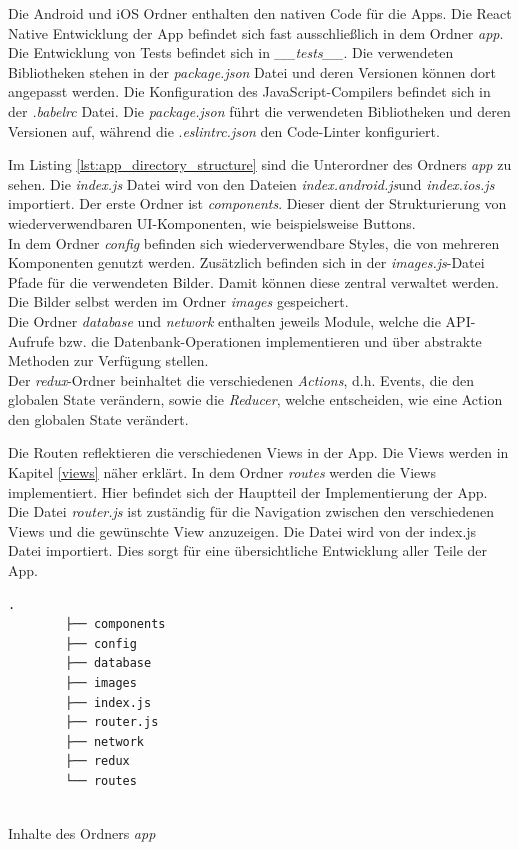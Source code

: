         Die Android und iOS Ordner enthalten den nativen Code für die Apps. Die React Native Entwicklung der App befindet sich fast ausschließlich in dem Ordner \textit{app}. Die Entwicklung von Tests befindet sich in \textit{\_\_tests\_\_}. Die verwendeten Bibliotheken stehen in der \textit{package.json} Datei und deren Versionen können dort angepasst werden. Die Konfiguration des JavaScript-Compilers befindet sich in der \textit{.babelrc} Datei. Die \textit{package.json} führt die verwendeten Bibliotheken und deren Versionen auf, während die .\textit{eslintrc.json} den Code-Linter konfiguriert.
        
        Im Listing \ref{lst:app_directory_structure} sind die Unterordner des Ordners \textit{app} zu sehen. Die \textit{index.js} Datei wird von den Dateien \textit{index.android.js}und \textit{index.ios.js} importiert. Der erste Ordner ist \textit{components}. Dieser dient der Strukturierung von wiederverwendbaren UI-Komponenten, wie beispielsweise Buttons. \\
        In dem Ordner \textit{config} befinden sich wiederverwendbare Styles, die von mehreren Komponenten genutzt werden. Zusätzlich befinden sich in der \textit{images.js}-Datei Pfade für die verwendeten Bilder. Damit können diese zentral verwaltet werden. Die Bilder selbst werden im Ordner \textit{images} gespeichert.\\
        Die Ordner \textit{database} und \textit{network} enthalten jeweils Module, welche die API-Aufrufe bzw. die Datenbank-Operationen implementieren und über abstrakte Methoden zur Verfügung stellen. \\
        Der \textit{redux}-Ordner beinhaltet die verschiedenen \textit{Actions}, d.h. Events, die den globalen State verändern, sowie die \textit{Reducer}, welche entscheiden, wie eine Action den globalen State verändert.
        
        Die Routen reflektieren die verschiedenen Views in der App. Die Views werden in Kapitel \ref{views} näher erklärt. In dem Ordner \textit{routes} werden die Views implementiert. Hier befindet sich der Hauptteil der Implementierung der App. Die Datei \textit{router.js} ist zuständig für die Navigation zwischen den verschiedenen Views und die gewünschte View anzuzeigen. Die Datei wird von der index.js Datei importiert. Dies sorgt für eine übersichtliche Entwicklung aller Teile der App. 
        
        \begin{lstlisting}[style=tree]
        .
        ├── components
        ├── config
        ├── database
        ├── images
        ├── index.js
        ├── router.js
        ├── network
        ├── redux
        └── routes
        
        \end{lstlisting}
        \vspace{-0.5 cm}
        \begin{listing}[H]
            \caption{Inhalte des Ordners \textit{app}}
            \label{lst:app_directory_structure}
        \end{listing}
    
